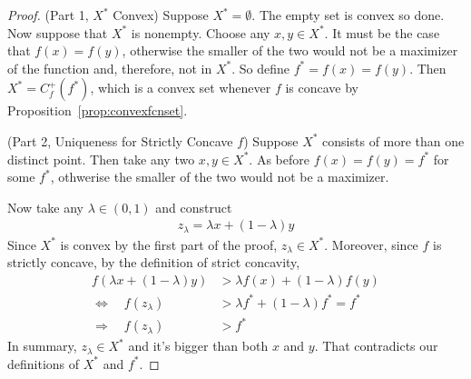 \documentclass[12pt]{article}
\numberwithin{equation}{section} %
\theoremstyle{plain}
\theoremstyle{definition}
\theoremstyle{remark}
\begin{document}
\begin{proof}


(Part 1, $X^*$ Convex) Suppose $X^*=\emptyset$. The empty set is convex
so done.  Now suppose that $X^*$ is nonempty. Choose any $x,y\in X^*$.
It must be the case that $f(x) = f(y)$, otherwise the smaller of the two
would not be a maximizer of the function and, therefore, not in $X^*$.
So define $f^* = f(x) = f(y)$.  Then $X^* = C^+_f(f^*)$, which is a
convex set whenever $f$ is concave by
Proposition~\ref{prop:convexfcnset}.

(Part 2, Uniqueness for Strictly Concave $f$)
Suppose $X^*$ consists of more than one distinct point. Then take any
two $x,y\in X^*$. As before $f(x)=f(y)=f^*$ for some $f^*$, othwerise
the smaller of the two would not be a maximizer.

Now take any $\lambda\in(0,1)$ and construct
\begin{align*}
  z_\lambda = \lambda x + (1-\lambda)y
\end{align*}
Since $X^*$ is convex by the first part of the proof, $z_\lambda\in
X^*$. Moreover, since $f$ is strictly concave, by the definition of
strict concavity,
\begin{align*}
  f(\lambda x + (1-\lambda) y)
  &>
  \lambda f(x) + (1-\lambda) f(y) \\
  \Leftrightarrow \quad
  f(z_\lambda) &> \lambda f^* + (1-\lambda) f^* = f^* \\
  \Rightarrow\quad
  f(z_\lambda) &> f^*
\end{align*}
In summary, $z_\lambda \in X^*$ and it's bigger than both $x$ and $y$.
That contradicts our definitions of $X^*$ and $f^*$.
\end{proof}
\end{document}
